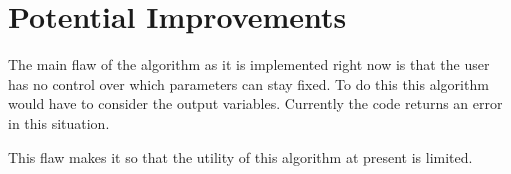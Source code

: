 \documentclass[oneside, a4paper, onecolumn, 11pt]{article}
\begin{document}
\section{Potential Improvements}

The main flaw of the algorithm as it is implemented right now is that the user has no control over which parameters can stay fixed. To do this this algorithm would have to consider the output variables. Currently the code returns an error in this situation.

This flaw makes it so that the utility of this algorithm at present is limited.

\newpage




\end{document}
